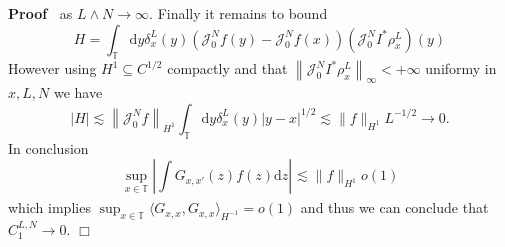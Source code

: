 \documentclass[a4paper,11pt]{article}
\newcommand{\mathd}{\mathrm{d}}
\newenvironment{proof}{\noindent\textbf{Proof\ }}{\hspace*{\fill}$\Box$\medskip}
\newcommand{\JJ}{\mathcal{J}}
\begin{document}
\begin{proof}
 as $L\wedge N \to \infty$. Finally it remains to bound
  \[ H = \int_{\mathbb{T}} \mathd y \delta_x^L (y) \left( \JJ^N_0 f (y) -
     \JJ^N_0 f (x) \right) (\JJ^N_0 I^{\ast} \rho_x^L) (y) \]
  However using $H^1 \subseteq C^{1 / 2}$ compactly and that $\left\| \JJ^N_0
  I^{\ast} \rho^L_x \right\|_{\infty} < + \infty$ uniformy in $x, L, N$ we
  have
  \[ | H | \lesssim \left\| \JJ^N_0 f \right\|_{H^1} \int_{\mathbb{T}} \mathd
     y \delta_x^L (y) | y - x |^{1 / 2} \lesssim \| f \|_{H^1} L^{- 1 / 2}
     \rightarrow 0. \]
  In conclusion
  \[ \sup_{x \in \mathbb{T}} \left| \int G_{x, x'} (z) f (z) \mathd z
     \right|_{} \lesssim \| f \|_{H^1} o (1) \]
  which implies
  $\sup_{x \in \mathbb{T}} \langle G_{x, x}, G_{x, x} \rangle_{H^{- 1}} = o
     (1) $
  and thus we can conclude that $C_1^{L, N} \rightarrow 0$.
\end{proof}
\end{document}

